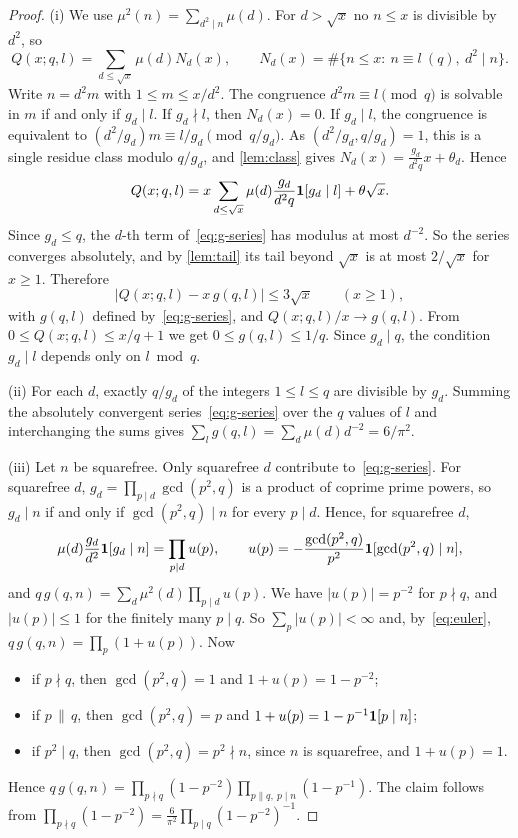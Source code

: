 \begin{proof}
(i) We use $\mu^2(n)=\sum_{d^2\mid n}\mu(d)$. For $d>\sqrt x$ no $n\le x$ is divisible by $d^2$, so
\[
Q(x;q,l)=\sum_{d\le\sqrt x}\mu(d)N_d(x),\qquad N_d(x)=\#\{n\le x:\ n\equiv l\ (q),\ d^2\mid n\}.
\]
Write $n=d^2m$ with $1\le m\le x/d^2$. The congruence $d^2m\equiv l\pmod q$ is solvable in $m$ if and only if $g_d\mid l$. If $g_d\nmid l$, then $N_d(x)=0$. If $g_d\mid l$, the congruence is equivalent to $(d^2/g_d)m\equiv l/g_d\pmod{q/g_d}$. As $(d^2/g_d,q/g_d)=1$, this is a single residue class modulo $q/g_d$, and \cref{lem:class} gives $N_d(x)=\frac{g_d}{d^2q}x+\theta_d$. Hence
\[
Q(x;q,l)=x\sum_{d\le\sqrt x}\mu(d)\frac{g_d}{d^2q}\mathbf{1}[g_d\mid l]+\theta\sqrt x .
\]
Since $g_d\le q$, the $d$-th term of~\eqref{eq:g-series} has modulus at most $d^{-2}$. So the series converges absolutely, and by \cref{lem:tail} its tail beyond $\sqrt x$ is at most $2/\sqrt x$ for $x\ge1$. Therefore
\begin{equation}\label{eq:Q-g}
|Q(x;q,l)-x\,g(q,l)|\le3\sqrt x\qquad(x\ge1),
\end{equation}
with $g(q,l)$ defined by~\eqref{eq:g-series}, and $Q(x;q,l)/x\to g(q,l)$. From $0\le Q(x;q,l)\le x/q+1$ we get $0\le g(q,l)\le1/q$. Since $g_d\mid q$, the condition $g_d\mid l$ depends only on $l\bmod q$.

(ii) For each $d$, exactly $q/g_d$ of the integers $1\le l\le q$ are divisible by $g_d$. Summing the absolutely convergent series~\eqref{eq:g-series} over the $q$ values of $l$ and interchanging the sums gives $\sum_l g(q,l)=\sum_d\mu(d)d^{-2}=6/\pi^2$.

(iii) Let $n$ be squarefree. Only squarefree $d$ contribute to~\eqref{eq:g-series}. For squarefree $d$, $g_d=\prod_{p\mid d}\gcd(p^2,q)$ is a product of coprime prime powers, so $g_d\mid n$ if and only if $\gcd(p^2,q)\mid n$ for every $p\mid d$. Hence, for squarefree $d$,
\[
\mu(d)\frac{g_d}{d^2}\mathbf{1}[g_d\mid n]=\prod_{p\mid d}u(p),\qquad u(p)=-\frac{\gcd(p^2,q)}{p^2}\mathbf{1}[\gcd(p^2,q)\mid n],
\]
and $q\,g(q,n)=\sum_{d}\mu^2(d)\prod_{p\mid d}u(p)$. We have $|u(p)|=p^{-2}$ for $p\nmid q$, and $|u(p)|\le1$ for the finitely many $p\mid q$. So $\sum_p|u(p)|<\infty$ and, by~\eqref{eq:euler}, $q\,g(q,n)=\prod_p(1+u(p))$. Now
\begin{itemize}
\item if $p\nmid q$, then $\gcd(p^2,q)=1$ and $1+u(p)=1-p^{-2}$;
\item if $p\,\|\,q$, then $\gcd(p^2,q)=p$ and $1+u(p)=1-p^{-1}\mathbf{1}[p\mid n]$;
\item if $p^2\mid q$, then $\gcd(p^2,q)=p^2\nmid n$, since $n$ is squarefree, and $1+u(p)=1$.
\end{itemize}
Hence $q\,g(q,n)=\prod_{p\nmid q}(1-p^{-2})\prod_{p\|q,\ p\mid n}(1-p^{-1})$. The claim follows from $\prod_{p\nmid q}(1-p^{-2})=\frac6{\pi^2}\prod_{p\mid q}(1-p^{-2})^{-1}$.


\end{proof}
